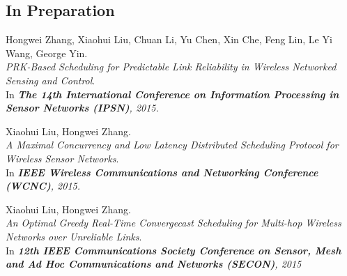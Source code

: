 \subsection{In Preparation}
\begin{thebibliography}{3}
Hongwei Zhang, Xiaohui Liu, Chuan Li, Yu Chen, Xin Che, Feng Lin, Le Yi Wang, George Yin.
\\ \newblock \emph{PRK-Based Scheduling for Predictable Link Reliability in Wireless Networked Sensing and Control}.
\\ \newblock In \emph{\textbf{The 14th International Conference on Information Processing in Sensor Networks (IPSN)}, 2015.}

Xiaohui Liu, Hongwei Zhang.
\\ \newblock \emph{A Maximal Concurrency and Low Latency Distributed Scheduling Protocol for Wireless Sensor Networks}.
\\ \newblock In \emph{\textbf{IEEE Wireless Communications and Networking Conference (WCNC)}, 2015.}

Xiaohui Liu, Hongwei Zhang.
\\ \newblock \emph{An Optimal Greedy Real-Time Convergecast Scheduling for Multi-hop Wireless Networks over Unreliable Links}.
\\ \newblock In \emph{\textbf{12th IEEE Communications Society Conference on Sensor, Mesh and Ad Hoc Communications and Networks (SECON)}, 2015}

\end{thebibliography}
